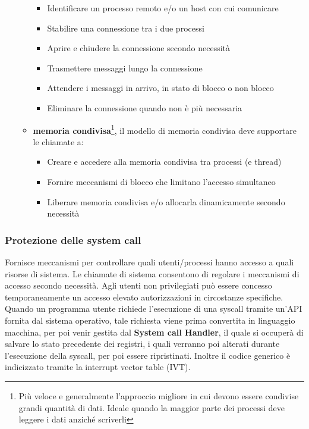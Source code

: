 \documentclass{article}
\begin{document}
\begin{itemize}
\begin{itemize}
        \begin{itemize}
            \item Identificare un processo remoto e/o un host con cui comunicare
            \item Stabilire una connessione tra i due processi
            \item Aprire e chiudere la connessione secondo necessità
            \item Trasmettere messaggi lungo la connessione
            \item Attendere i messaggi in arrivo, in stato di blocco o non blocco
            \item Eliminare la connessione quando non è più necessaria
        \end{itemize}
        \item \textbf{memoria condivisa}\footnote{Più veloce e generalmente l'approccio migliore in cui devono essere condivise grandi quantità di dati. Ideale quando la maggior parte dei processi deve leggere i dati anziché scriverli}, il modello di memoria condivisa deve supportare le chiamate a:
        \begin{itemize}
            \item  Creare e accedere alla memoria condivisa tra processi (e thread) 
            \item Fornire meccanismi di blocco che limitano l'accesso simultaneo
            \item Liberare memoria condivisa e/o allocarla dinamicamente secondo necessità
        \end{itemize}
    \end{itemize}
\end{itemize}

\subsubsection{Protezione delle system call}
Fornisce meccanismi per controllare quali utenti/processi hanno accesso a quali risorse di sistema. Le chiamate di sistema consentono di regolare i meccanismi di accesso secondo necessità. Agli utenti non privilegiati può essere concesso temporaneamente un accesso elevato autorizzazioni in circostanze specifiche. 
Quando un programma utente richiede l'esecuzione di una syscall tramite un'API fornita dal sistema operativo, tale richiesta viene prima convertita in linguaggio macchina, per poi venir gestita dal \textbf{System call Handler}, il quale si occuperà di salvare lo stato precedente dei registri, i quali verranno poi alterati durante l'esecuzione della syscall, per poi essere ripristinati. Inoltre il codice generico è indicizzato tramite la interrupt vector table (IVT).
\end{document}
